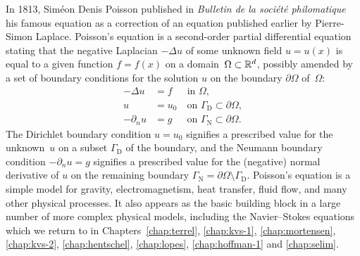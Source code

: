 In 1813, Sim\'eon Denis Poisson published in \emph{Bulletin de la
soci\'et\'e philomatique} his famous equation as a correction of
an equation published earlier by Pierre-Simon Laplace. Poisson's
equation is a second-order partial differential equation stating that
the negative Laplacian $-\Delta u$ of some unknown field $u = u(x)$ is
equal to a given function $f = f(x)$ on a domain~$\Omega \subset \mathbb{R}^d$,
possibly amended by a set of boundary conditions for the solution $u$
on the boundary $\partial \Omega$ of~$\Omega$:
\begin{equation} \label{eq:poisson}
  \begin{split}
    - \Delta u &= f \,\,\, \quad \mbox{in } \Omega,
    \\
    u &= u_0 \quad \mbox{on } \Gamma_{\mathrm{D}} \subset \partial \Omega,
    \\
    - \partial_n u &= g \,\,\, \quad \mbox{on } \Gamma_{\mathrm{N}} \subset \partial \Omega.
  \end{split}
\end{equation}
The Dirichlet boundary condition $u = u_0$ signifies a prescribed
value for the unknown~$u$ on a subset $\Gamma_{\mathrm{D}}$ of the
boundary, and the Neumann boundary condition $-\partial_n u = g$
signifies a prescribed value for the (negative) normal derivative of
$u$ on the remaining boundary $\Gamma_{\mathrm{N}} = \partial \Omega
\setminus \Gamma_{\mathrm{D}}$. Poisson's equation is a simple model
for gravity, electromagnetism, heat transfer, fluid flow, and many
other physical processes. It also appears as the basic building block
in a large number of more complex physical models, including the
Navier--Stokes equations which we return to in
Chapters~\ref{chap:terrel}, \ref{chap:kvs-1},
\ref{chap:mortensen},
\ref{chap:kvs-2}, \ref{chap:hentschel}, \ref{chap:lopes},
 \ref{chap:hoffman-1} and \ref{chap:selim}.

